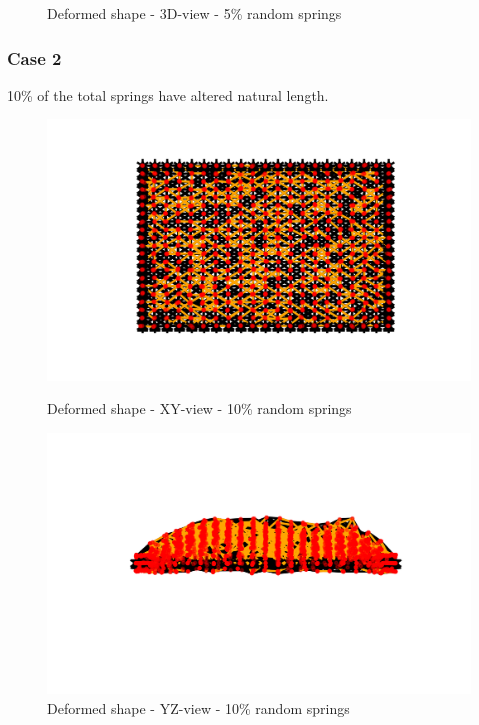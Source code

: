 \begin{figure}[!htbp]
\begin{minipage}{0.3\textwidth}
    \caption{Deformed shape - 3D-view - 5\% random springs}
    \label{fig:rand_5_3d}
\end{minipage}
\end{figure}

\subsubsection{Case 2}
10\% of the total springs have altered natural length.
\begin{figure}[!htbp]
\begin{minipage}{0.3\textwidth}
    \centering
    \includegraphics[width = 1\textwidth]{Figures/rand_10_XY.png}
    \caption{Deformed shape - XY-view - 10\% random springs}
    \label{fig:rand_10_xy}
\end{minipage}
\hspace{5mm}
\begin{minipage}{0.3\textwidth}
    \centering
    \includegraphics[width = 1\textwidth]{Figures/rand_10_YZ.png}
    \caption{Deformed shape - YZ-view - 10\% random springs}

\end{minipage}
\end{figure}
